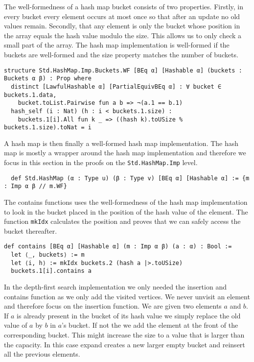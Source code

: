 The well-formedness of a hash map bucket consists of two properties. Firstly, in every bucket every element occurs at most once so that after an update no old values remain. Secondly, that any element is only the bucket whose position in the array equals the hash value modulo the size. This allows us to only check a small part of the array. The hash map implementation is well-formed if the buckets are well-formed and the size property matches the number of buckets.

\begin{lstlisting}
structure Std.HashMap.Imp.Buckets.WF [BEq α] [Hashable α] (buckets : Buckets α β) : Prop where
  distinct [LawfulHashable α] [PartialEquivBEq α] : ∀ bucket ∈ buckets.1.data,
    bucket.toList.Pairwise fun a b => ¬(a.1 == b.1)
  hash_self (i : Nat) (h : i < buckets.1.size) :
    buckets.1[i].All fun k _ => ((hash k).toUSize % buckets.1.size).toNat = i
\end{lstlisting}

A hash map is then finally a well-formed hash map implementation. The hash map is mostly a wrapper around the hash map implementation and therefore we focus in this section in the proofs on the \lstinline|Std.HashMap.Imp| level.

\begin{lstlisting}
  def Std.HashMap (α : Type u) (β : Type v) [BEq α] [Hashable α] := {m : Imp α β // m.WF}
\end{lstlisting}

The contains functions uses the well-formedness of the hash map implementation to look in the bucket placed in the position of the hash value of the element. The function \lstinline|mkIdx| calculates the position and proves that we can safely access the bucket thereafter.

\begin{lstlisting}
def contains [BEq α] [Hashable α] (m : Imp α β) (a : α) : Bool :=
  let ⟨_, buckets⟩ := m
  let ⟨i, h⟩ := mkIdx buckets.2 (hash a |>.toUSize)
  buckets.1[i].contains a
\end{lstlisting}

In the depth-first search implementation we only needed the insertion and contains function as we only add the visited vertices. We never unvisit an element and therefore focus on the insertion function. We are given two elements $a$ and $b$. If $a$ is already present in the bucket of its hash value we simply replace the old value of $a$ by $b$ in $a$'s bucket. If not the we add the element at the front of the corresponding bucket. This might increase the size to a value that is larger than the capacity. In this case expand creates a new larger empty bucket and reinsert all the previous elements.

